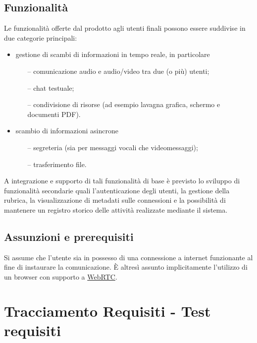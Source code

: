 \subsection{Funzionalità}
Le funzionalità offerte dal prodotto agli utenti finali possono essere suddivise in due categorie principali:
\begin{itemize}
  \item gestione di scambi di informazioni in tempo reale, in particolare
  \begin{itemize}
  \item[--] comunicazione audio e audio/video tra due (o più) utenti;
  \item[--] chat testuale;
  \item[--] condivisione di risorse (ad esempio lavagna grafica, schermo e documenti PDF). 
  \end{itemize}
  \item scambio di informazioni asincrone 
  \begin{itemize}
  \item[--] segreteria (sia per messaggi vocali che videomessaggi);
  \item[--] trasferimento file.
  \end{itemize}
\end{itemize}
A integrazione e supporto di tali funzionalità di base è previsto lo sviluppo di funzionalità secondarie quali l'autenticazione degli utenti, la gestione della rubrica, la visualizzazione di metadati sulle connessioni e la possibilità di mantenere un registro storico delle attività realizzate mediante il sistema.

\subsection{Assunzioni e prerequisiti}
Si assume che l'utente sia in possesso di una connessione a internet funzionante al fine di instaurare la comunicazione. È altresì assunto implicitamente l'utilizzo di un browser con supporto a \underline{WebRTC}.

\clearpage


\section{Tracciamento Requisiti - Test requisiti}\label{sec:tracciamento test}


